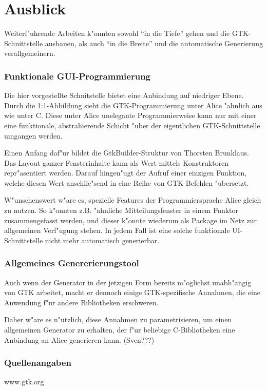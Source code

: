 \documentclass{article}
\begin{document}

\part{Ausblick}

Weiterf"uhrende Arbeiten k"onnten sowohl ``in die Tiefe'' gehen und die
GTK-Schnittstelle ausbauen, als auch ``in die Breite'' und die automatische
Generierung verallgemeinern.

\section{Funktionale GUI-Programmierung}

Die hier vorgestellte Schnitstelle bietet eine Anbindung auf niedriger Ebene.
Durch die 1:1-Abbildung sieht die GTK-Programmierung unter Alice "ahnlich
aus wie unter C. Diese unter Alice unelegante Programmierweise kann
nur mit einer eine funktionale, abstrahierende Schicht "uber der
eigentlichen GTK-Schnittstelle umgangen werden.

Einen Anfang daf"ur bildet die GtkBuilder-Struktur von Thorsten Brunklaus.
Das Layout ganzer Fensterinhalte kann als Wert mittels Konstruktoren
repr"asentiert werden. Darauf hingen"ugt der Aufruf einer einzigen Funktion,
welche diesen Wert anschlie"send in eine Reihe von GTK-Befehlen "ubersetzt.

W"unschenswert w"are es, spezielle Features der Programmiersprache Alice
gleich zu nutzen. So k"onnten z.B. "ahnliche Mitteilungsfenster
in einem Funktor zusammengefasst werden, und dieser k"onnte wiederum als
Package im Netz zur allgemeinen Verf"ugung stehen. In jedem Fall ist eine
solche funktionale UI-Schnittstelle nicht mehr automatisch generierbar.

\section{Allgemeines Genererierungstool}

Auch wenn der Generator in der jetzigen Form bereits m"oglichst unabh"angig
von GTK arbeitet, macht er dennoch einige GTK-spezifische Annahmen, die
eine Anwendung f"ur andere Bibliotheken erschweren.

Daher w"are es n"utzlich, diese Annahmen zu parametrisieren, um einen
allgemeinen Generator zu erhalten, der f"ur beliebige C-Bibliotheken
eine Anbindung an Alice generieren kann. (Sven???)

\section*{Quellenangaben}

www.gtk.org
\end{document}
